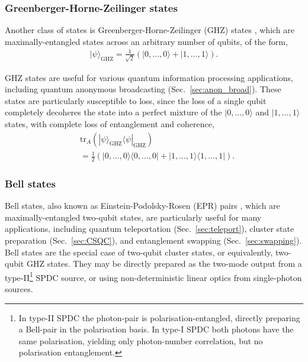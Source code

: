 \documentclass[aps, rmp, twocolumn, amsmath, amssymb, nofootinbib, superscriptaddress, longbibliography, floatfix, table-of-contents, eqsecnum]{revtex4-1}
\newcommand{\bra}[1]{\langle#1|}
\newcommand{\ket}[1]{|#1\rangle}
\begin{document}
%
%

\subsubsection{Greenberger-Horne-Zeilinger states} 

Another class of states is Greenberger-Horne-Zeilinger (GHZ) states \cite{bib:GHZ89}, which are maximally-entangled states across an arbitrary number of qubits, of the form,
\begin{align}
\ket\psi_\text{GHZ} = \frac{1}{\sqrt{2}}(\ket{0,\dots,0} + \ket{1,\dots,1}).
\end{align}

GHZ states are useful for various quantum information processing applications, including quantum anonymous broadcasting (Sec.~\ref{sec:anon_broad}). These states are particularly susceptible to loss, since the loss of a single qubit completely decoheres the state into a perfect mixture of the \mbox{$\ket{0,\dots,0}$} and \mbox{$\ket{1,\dots,1}$} states, with complete loss of entanglement and coherence,
\begin{align}
&\text{tr}_A(\ket\psi_\text{GHZ}\bra\psi_\text{GHZ})\nonumber \\
&= \frac{1}{2}(\ket{0,\dots,0}\bra{0,\dots,0}+\ket{1,\dots,1}\bra{1,\dots,1}).
\end{align}

%
%

\subsubsection{Bell states} \label{sec:bell_state_res} 

Bell states, also known as Einstein-Podolsky-Rosen (EPR) pairs \cite{bib:EPR35}, which are maximally-entangled two-qubit states, are particularly useful for many applications, including quantum teleportation (Sec.~\ref{sec:teleport}), cluster state preparation (Sec.~\ref{sec:CSQC}), and entanglement swapping (Sec.~\ref{sec:swapping}). Bell states are the special case of two-qubit cluster states, or equivalently, two-qubit GHZ states. They may be directly prepared as the two-mode output from a type-II\footnote{In type-II SPDC the photon-pair is polarisation-entangled, directly preparing a Bell-pair in the polarisation basis. In type-I SPDC both photons have the same polarisation, yielding only photon-number correlation, but no polarisation entanglement.} SPDC source, or using non-deterministic linear optics from single-photon sources.
\end{document}
